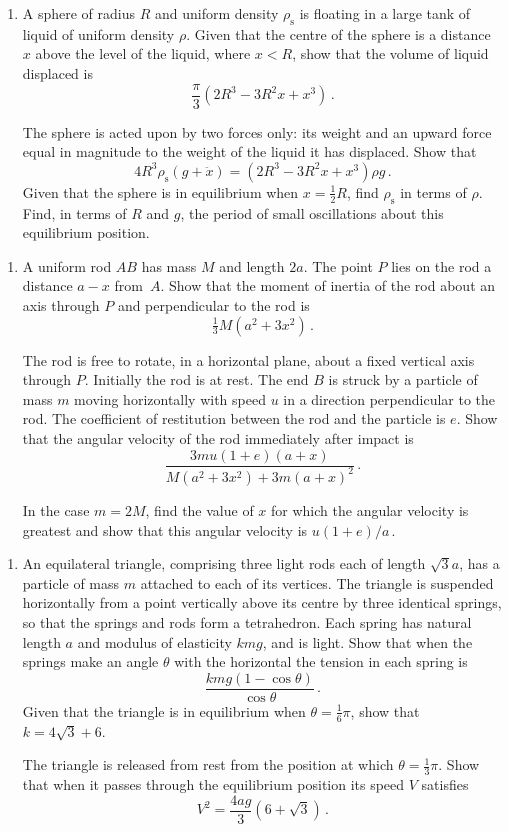 \documentclass[a4, 11pt]{report}
\newlength{\qspace}
\newcounter{qnumber}
\newenvironment{question}%
 {\vspace{\qspace}
  \begin{enumerate}[\bfseries 1\quad][10]%
    \setcounter{enumi}{\value{qnumber}}%
    \item%
 }
{
  \end{enumerate}
  \filbreak
  \stepcounter{qnumber}
 }
\begin{document}
	
\begin{question}
A sphere of radius $R$ and uniform density $\rho_{\text{s}}$ is floating in 
a large tank of liquid of uniform density $\rho$. 
Given that the centre of the sphere is a distance 
$x$ above the level of the liquid, where $x<R$, show that the volume
of liquid displaced is 
\[
\frac \pi 3 (2R^3-3R^2x +x^3)\,. 
\]

The sphere is acted upon by two forces only: its weight and 
an upward force equal in magnitude to the weight of the liquid it has 
displaced. Show that
\[
4 R^3\rho_{\text{s}} (g+\ddot x) = (2R^3 -3R^2x +x^3)\rho g\,.
\]
Given that the sphere is in equilibrium when $x=\frac12 R$, find 
$\rho_{\text{s}}$ in terms of $\rho$. Find, in terms of $R$ and $g$,
 the period of small oscillations 
about this equilibrium position.
\end{question}
	
\begin{question}	
A uniform rod $AB$ has mass $M$ and length $2a$. The point
$P$ lies on the rod a distance $a-x$ from~$A$. Show that the 
moment of inertia of the rod about an axis through $P$ and 
perpendicular to 
the rod is
\[
\tfrac13 M(a^2 +3x^2)\,.
\]

The rod is free 
to rotate, in a horizontal plane, about a fixed vertical axis through $P$. 
Initially the rod is at rest. The end $B$ is struck by a particle of
mass $m$ moving horizontally with speed $u$ in a direction
perpendicular to the rod.
The coefficient of restitution between the rod and the particle is $e$.
Show that the angular velocity of the rod immediately after impact
is 
\[
\frac{3mu(1+e)(a+x)}{M(a^2+3x^2) +3m(a+x)^2}\,.
\]

In the case $m=2M$, find the value of $x$ for which the angular velocity 
is greatest and show that this angular velocity is $u(1+e)/a\,$.
\end{question}


\begin{question}
An equilateral triangle, comprising three light rods each of
length $\sqrt3a$, has a particle of mass $m$ attached to each of 
its vertices. The triangle is suspended horizontally from a point vertically
above its centre by three identical springs, so that the springs and 
rods form a tetrahedron.
 Each spring has natural length $a$ and modulus
of elasticity $kmg$, and is light. 
Show that when the springs make an angle $\theta$
with the horizontal the tension in each spring is
\[
\frac{ kmg(1-\cos\theta)}{\cos\theta}\,.
\]
Given that the triangle is in equilibrium when $\theta = \frac16 \pi$, show
that $k=4\sqrt3 +6$.

The triangle is released from rest from the position 
at which $\theta=\frac13\pi$.
Show that when it passes through the equilibrium position its speed $V$ 
satisfies 
\[
V^2 = \frac{4ag}3(6+\sqrt3)\,.
\]
\end{question}
	
\end{document}
